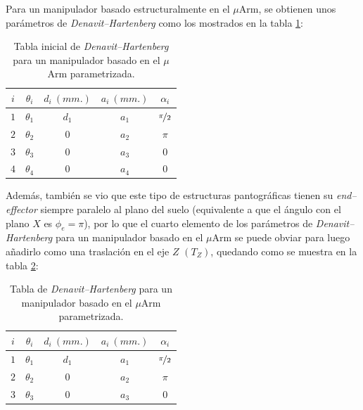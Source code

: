 Para un manipulador basado estructuralmente en el $\mu$Arm, se obtienen unos parámetros
de \textit{Denavit--Hartenberg} como los mostrados en la tabla \ref{tab:dh-params-with-phi}:

\begin{table}[H]
    \centering
    \begin{tabular}{ c | c c c c }
        $i$ & $\theta_i$ & $d_i~(mm.)$ & $a_i~(mm.)$ & $\alpha_i$          \\ [0.5ex]
        \hline
        $1$ & $\theta_1$ & $d_1$       & $a_1$       & $\nicefrac{\pi}{2}$ \\
        $2$ & $\theta_2$ & $0$         & $a_2$       & $\pi$               \\
        $3$ & $\theta_3$ & $0$         & $a_3$       & $0$                 \\
        $4$ & $\theta_4$ & $0$         & $a_4$       & $0$                 \\ [1ex]
    \end{tabular}
    \caption{Tabla inicial de \textit{Denavit–Hartenberg} para un manipulador basado en el $\mu$Arm parametrizada.}
    \label{tab:dh-params-with-phi}
\end{table}

Además, también se vio que este tipo de estructuras pantográficas
tienen su \textit{end--effector} siempre paralelo al plano del suelo (equivalente
a que el ángulo con el plano $X$ es $\phi_e = \pi$), por lo que el cuarto elemento de
los parámetros de \textit{Denavit--Hartenberg} para un manipulador basado en el $\mu$Arm
se puede obviar para luego añadirlo como una traslación en el eje $Z$ $\left(T_Z\right)$,
quedando como se muestra en la tabla \ref{tab:dh-params}:

\begin{table}[H]
    \centering
    \begin{tabular}{ c | c c c c }
        $i$ & $\theta_i$ & $d_i~(mm.)$ & $a_i~(mm.)$ & $\alpha_i$          \\ [0.5ex]
        \hline
        $1$ & $\theta_1$ & $d_1$       & $a_1$       & $\nicefrac{\pi}{2}$ \\
        $2$ & $\theta_2$ & $0$         & $a_2$       & $\pi$               \\
        $3$ & $\theta_3$ & $0$         & $a_3$       & $0$                 \\ [1ex]
    \end{tabular}
    \caption{Tabla de \textit{Denavit–Hartenberg} para un manipulador basado en el $\mu$Arm parametrizada.}
    \label{tab:dh-params}
\end{table}


